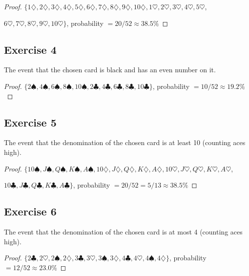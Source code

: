 \documentclass[14pt]{extarticle}
\begin{document}
\begin{proof}
\(\{1\diamondsuit, 2\diamondsuit, 3\diamondsuit, 4\diamondsuit, 5\diamondsuit, 6\diamondsuit, 7\diamondsuit, 
8\diamondsuit, 9\diamondsuit, 10\diamondsuit, 1\heartsuit, 2\heartsuit, 3\heartsuit, 4\heartsuit, 5\heartsuit\), 

\(6\heartsuit, 7\heartsuit, 8\heartsuit, 9\heartsuit, 10\heartsuit\}\), probability \(= 20/52 \approx 38.5\%\)
\end{proof}

\subsection{Exercise 4}
The event that the chosen card is black and has an even number on it.

\begin{proof}
\(\{2\spadesuit, 4\spadesuit, 6\spadesuit, 8\spadesuit, 10\spadesuit, 2\clubsuit, 4\clubsuit, 6\clubsuit, 
8\clubsuit, 10\clubsuit\}\), probability \(= 10/52 \approx 19.2\%\)
\end{proof}

\subsection{Exercise 5}
The event that the denomination of the chosen card is at least 10 (counting aces high).

\begin{proof}
\(\{10\spadesuit, J\spadesuit, Q\spadesuit, K\spadesuit, A\spadesuit, 10\diamondsuit, J\diamondsuit, Q\diamondsuit, 
K\diamondsuit, A\diamondsuit, 10\heartsuit, J\heartsuit, Q\heartsuit, K\heartsuit, A\heartsuit\), 

\(10\clubsuit, J\clubsuit, Q\clubsuit, K\clubsuit, A\clubsuit\}\), probability \(= 20/52=5/13 \approx 38.5\%\)
\end{proof}

\subsection{Exercise 6}
The event that the denomination of the chosen card is at most 4 (counting aces high).

\begin{proof}
\(\{2\clubsuit, 2\heartsuit, 2\spadesuit, 2\diamondsuit, 3\clubsuit, 3\heartsuit, 3\spadesuit, 3\diamondsuit, 
4\clubsuit, 4\heartsuit, 4\spadesuit, 4\diamondsuit\}\), probability \(= 12/52 \approx 23.0\%\)
\end{proof}
\end{document}
